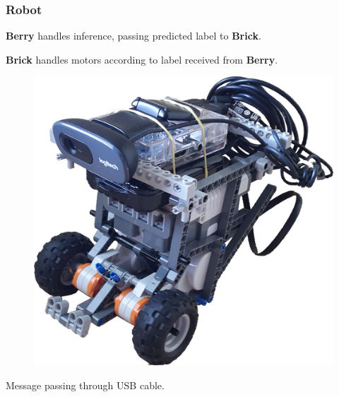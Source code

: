 \documentclass{beamer}
\begin{document}
\begin{frame}
  \frametitle{Robot}

  \textbf{Berry} handles inference, passing predicted label to \textbf{Brick}.

  \textbf{Brick} handles motors according to label received from \textbf{Berry}.

  \begin{figure}
    \centering\includegraphics[height=0.5\textheight]{imgs/robot.png}
  \end{figure}

  \centering Message passing through USB cable.
\end{frame}
\end{document}
